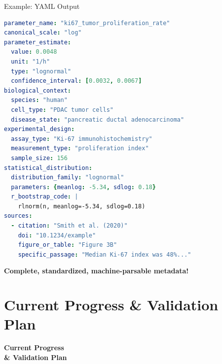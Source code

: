 \documentclass[10pt]{beamer}
\begin{document}
\begin{frame}[fragile]{Example: YAML Output}

  \begin{lstlisting}[language=yaml, basicstyle=\ttfamily\tiny]
parameter_name: "ki67_tumor_proliferation_rate"
canonical_scale: "log"
parameter_estimate:
  value: 0.0048
  unit: "1/h"
  type: "lognormal"
  confidence_interval: [0.0032, 0.0067]
biological_context:
  species: "human"
  cell_type: "PDAC tumor cells"
  disease_state: "pancreatic ductal adenocarcinoma"
experimental_design:
  assay_type: "Ki-67 immunohistochemistry"
  measurement_type: "proliferation index"
  sample_size: 156
statistical_distribution:
  distribution_family: "lognormal"
  parameters: {meanlog: -5.34, sdlog: 0.18}
  r_bootstrap_code: |
    rlnorm(n, meanlog=-5.34, sdlog=0.18)
sources:
  - citation: "Smith et al. (2020)"
    doi: "10.1234/example"
    figure_or_table: "Figure 3B"
    specific_passage: "Median Ki-67 index was 48%..."
  \end{lstlisting}

  \textbf{Complete, standardized, machine-parsable metadata!}

\end{frame}

\section{Current Progress \& Validation Plan}

\begin{frame}[plain,c]
  \begin{center}
    \Huge\textbf{Current Progress}\\
    \Huge\textbf{\& Validation Plan}
  \end{center}
\end{frame}
\end{document}
